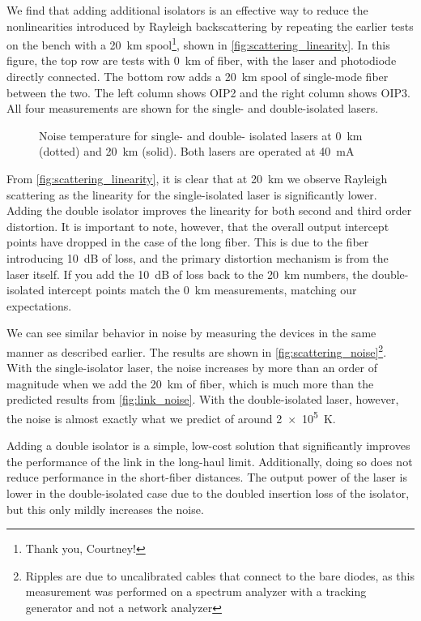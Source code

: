 We find that adding additional isolators is an effective way to reduce the nonlinearities introduced by Rayleigh backscattering by repeating the earlier tests on the bench with a \qty{20}{\km} spool\footnote{Thank you, Courtney!}, shown in \autoref{fig:scattering_linearity}.
In this figure, the top row are tests with \qty{0}{\km} of fiber, with the laser and photodiode directly connected.
The bottom row adds a \qty{20}{\km} spool of single-mode fiber between the two.
The left column shows OIP2 and the right column shows OIP3.
All four measurements are shown for the single- and double-isolated lasers.

\begin{figure}[ht!]
    \centering
    
    \caption[Noise temperature for single- and double- isolated lasers]{Noise temperature for single- and double- isolated lasers at \qty{0}{\km} (dotted) and \qty{20}{\km} (solid). Both lasers are operated at \qty{40}{mA}}
    \label{fig:scattering_noise}
\end{figure}

From \autoref{fig:scattering_linearity}, it is clear that at \qty{20}{\km} we observe Rayleigh scattering as the linearity for the single-isolated laser is significantly lower.
Adding the double isolator improves the linearity for both second and third order distortion.
It is important to note, however, that the overall output intercept points have dropped in the case of the long fiber.
This is due to the fiber introducing \qty{10}{\dB} of loss, and the primary distortion mechanism is from the laser itself.
If you add the \qty{10}{\dB} of loss back to the \qty{20}{\km} numbers, the double-isolated intercept points match the \qty{0}{\km} measurements, matching our expectations.

We can see similar behavior in noise by measuring the devices in the same manner as described earlier.
The results are shown in \autoref{fig:scattering_noise}\footnote{Ripples are due to uncalibrated cables that connect to the bare diodes, as this measurement was performed on a spectrum analyzer with a tracking generator and not a network analyzer}.
With the single-isolator laser, the noise increases by more than an order of magnitude when we add the \qty{20}{\km} of fiber, which is much more than the predicted results from \autoref{fig:link_noise}.
With the double-isolated laser, however, the noise is almost exactly what we predict of around \qty{2e5}{\K}.

Adding a double isolator is a simple, low-cost solution that significantly improves the performance of the link in the long-haul limit.
Additionally, doing so does not reduce performance in the short-fiber distances.
The output power of the laser is lower in the double-isolated case due to the doubled insertion loss of the isolator, but this only mildly increases the noise.

